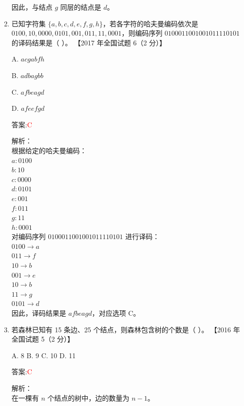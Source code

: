 \documentclass[lang=cn,newtx,10pt,scheme=chinese]{../../../elegantbook}
\begin{document}
\begin{enumerate}
        因此，与结点 $g$ 同层的结点是 $d$。\\
    
        \item 已知字符集 $\{a, b, c, d, e, f, g, h\}$，若各字符的哈夫曼编码依次是 $0100, 10, 0000, 0101, 001, 011, 11, 0001$，则编码序列 $0100011001001011110101$ 的译码结果是（ ）。  
        【2017 年全国试题 6（2 分）】  
    
        A. $acgabfh$  
    
        B. $adbagbb$  
    
        C. $afbeagd$  
    
        D. $afeefgd$  
    
        答案:\textcolor{red}{C}
        
        解析：\\
        根据给定的哈夫曼编码：\\
        $a: 0100$\\
        $b: 10$\\
        $c: 0000$\\
        $d: 0101$\\
        $e: 001$\\
        $f: 011$\\
        $g: 11$\\
        $h: 0001$\\
        
        对编码序列 $0100011001001011110101$ 进行译码：\\
        $0100 \rightarrow a$\\
        $011 \rightarrow f$\\
        $10 \rightarrow b$\\
        $001 \rightarrow e$\\
        $10 \rightarrow b$\\
        $11 \rightarrow g$\\
        $0101 \rightarrow d$\\
        
        因此，译码结果是 $afbeagd$，对应选项 C。\\
    
        \item 若森林已知有 15 条边、25 个结点，则森林包含树的个数是（ ）。  
        【2016 年全国试题 5（2 分）】 
    
        A. 8 \quad B. 9 \quad C. 10 \quad D. 11  
    
        答案:\textcolor{red}{C}
        
        解析：\\
        在一棵有 $n$ 个结点的树中，边的数量为 $n-1$。\\
        

\end{enumerate}
\end{document}

